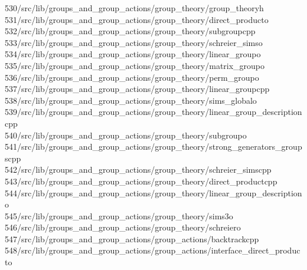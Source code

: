 \begin{tabbing}
530\>/src/lib/groups\_and\_group\_actions/group\_theory/group\_theoryh\\[0pt]
531\>/src/lib/groups\_and\_group\_actions/group\_theory/direct\_producto\\[0pt]
532\>/src/lib/groups\_and\_group\_actions/group\_theory/subgroupcpp\\[0pt]
533\>/src/lib/groups\_and\_group\_actions/group\_theory/schreier\_simso\\[0pt]
534\>/src/lib/groups\_and\_group\_actions/group\_theory/linear\_groupo\\[0pt]
535\>/src/lib/groups\_and\_group\_actions/group\_theory/matrix\_groupo\\[0pt]
536\>/src/lib/groups\_and\_group\_actions/group\_theory/perm\_groupo\\[0pt]
537\>/src/lib/groups\_and\_group\_actions/group\_theory/linear\_groupcpp\\[0pt]
538\>/src/lib/groups\_and\_group\_actions/group\_theory/sims\_globalo\\[0pt]
539\>/src/lib/groups\_and\_group\_actions/group\_theory/linear\_group\_descriptioncpp\\[0pt]
540\>/src/lib/groups\_and\_group\_actions/group\_theory/subgroupo\\[0pt]
541\>/src/lib/groups\_and\_group\_actions/group\_theory/strong\_generators\_groupscpp\\[0pt]
542\>/src/lib/groups\_and\_group\_actions/group\_theory/schreier\_simscpp\\[0pt]
543\>/src/lib/groups\_and\_group\_actions/group\_theory/direct\_productcpp\\[0pt]
544\>/src/lib/groups\_and\_group\_actions/group\_theory/linear\_group\_descriptiono\\[0pt]
545\>/src/lib/groups\_and\_group\_actions/group\_theory/sims3o\\[0pt]
546\>/src/lib/groups\_and\_group\_actions/group\_theory/schreiero\\[0pt]
547\>/src/lib/groups\_and\_group\_actions/group\_actions/backtrackcpp\\[0pt]
548\>/src/lib/groups\_and\_group\_actions/group\_actions/interface\_direct\_producto\\[0pt]

\end{tabbing}
